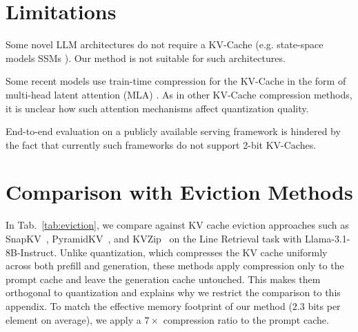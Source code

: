 \documentclass{llmxive}
\begin{document}
\section{Limitations}
\label{sec:limitations}
Some novel LLM architectures do not require a KV-Cache (e.g. state-space models SSMs \cite{somvanshi2025s4_mamba}). Our method is not suitable for such architectures. 

Some recent models use train-time compression for the KV-Cache in the form of multi-head latent attention (MLA) \cite{liu2024deepseek}. As in other KV-Cache compression methods, it is unclear how such attention mechanisms affect quantization quality. 

End-to-end evaluation on a publicly available serving framework is hindered by the fact that currently such frameworks do not support 2-bit KV-Caches.

\section{Comparison with Eviction Methods}
\label{sec:evict}

In Tab.~\ref{tab:eviction}, we compare against KV cache eviction approaches such as SnapKV~\citep{NEURIPS2024_28ab4182_SnapKV}, PyramidKV~\citep{cai2025pyramidkv}, and KVZip~\citep{kim2026kvzip} on the Line Retrieval task with Llama-3.1-8B-Instruct. Unlike quantization, which compresses the KV cache uniformly across both prefill and generation, these methods apply compression only to the prompt cache and leave the generation cache untouched. This makes them orthogonal to quantization and explains why we restrict the comparison to this appendix. To match the effective memory footprint of our method ($2.3$ bits per element on average), we apply a $7\times$ compression ratio to the prompt cache.
\end{document}
